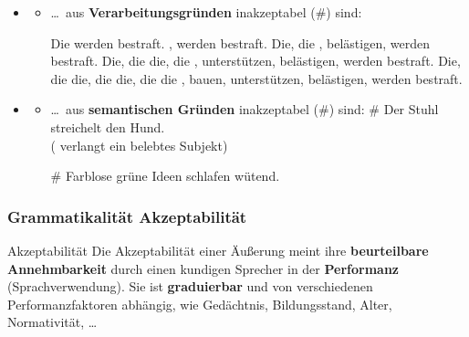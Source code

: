 \begin{frame}

\begin{itemize}
	\item[]
	
	\begin{itemize}
	\item \dots\ aus \textbf{Verarbeitungsgründen} inakzeptabel (\#) sind:
		
\pause
		\ex Die werden bestraft.
		\ex {}, werden bestraft.
		\ex Die, die , belästigen, werden bestraft.
		\ex Die, die die, die , unterstützen, belästigen, werden bestraft.
		\ex Die, die die, die die, die die , bauen, unterstützen, belästigen, werden bestraft.
		\z
\end{itemize}

\end{itemize}
\nocite{Fries15a, Repp&Co15a}
\end{frame}


\begin{frame}

\begin{itemize}
	\item[]
	
	\begin{itemize}
		
		\item \dots\ aus \textbf{semantischen Gründen} inakzeptabel (\#) sind:
		\ea \# Der Stuhl streichelt den Hund.\\
		( verlangt ein belebtes Subjekt)
		\z
		
		\ea \# Farblose grüne Ideen schlafen wütend. \hfill 
		\citep{Chomsky57a}
		\z
		
	\end{itemize}

\end{itemize}
\nocite{Coseriu88a, Fries15a, Repp&Co15a}
\end{frame}


\begin{frame}
\frametitle{Grammatikalität \vs Akzeptabilität}

\begin{block}{Akzeptabilität}
Die Akzeptabilität einer Äußerung meint ihre \textbf{beurteilbare Annehmbarkeit} durch einen kundigen Sprecher in der \textbf{Performanz} (Sprachverwendung). Sie ist \textbf{graduierbar} und von verschiedenen Performanzfaktoren abhängig, wie \zB Gedächtnis, Bildungsstand, Alter, Normativität, \dots\ \citep[vgl.][]{Fries&MyP16b}

\end{block}

\end{frame}


